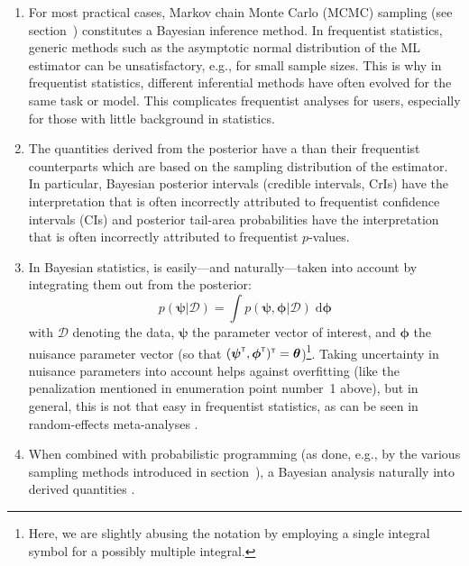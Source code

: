 \begin{enumerate}
  \item For most practical cases, Markov chain Monte Carlo (MCMC) sampling (see
  section~) constitutes a  Bayesian inference
  method. In frequentist statistics, generic methods such as the asymptotic
  normal distribution of the ML estimator can be unsatisfactory, e.g., for
  small sample sizes. This is why in frequentist statistics, different
  inferential methods have often evolved for the same task or model. This
  complicates frequentist analyses for users, especially for those with
  little background in statistics.

  \item The quantities derived from the posterior have a  than their frequentist counterparts which are based on the
  sampling distribution of the estimator. In particular, Bayesian posterior
  intervals (credible intervals, CrIs) have the interpretation that is often
  incorrectly attributed to frequentist confidence intervals (CIs)
  \citep{mcelreath_statistical_2020} and posterior tail-area probabilities
  have the interpretation that is often incorrectly attributed to frequentist
  $p$-values.

  \item In Bayesian statistics,  is
  easily---and naturally---taken into account by integrating them out from
  the posterior:
  \begin{equation}
  p(\boldsymbol{\psi} | \boldsymbol{\mathcal{D}}) =
  \int p(\boldsymbol{\psi}, \boldsymbol{\phi} | \boldsymbol{\mathcal{D}})
  \; \text{d}\boldsymbol{\phi}
    \label{eqn:nuisance}
  \end{equation}
  with $\boldsymbol{\mathcal{D}}$ denoting the data, $\boldsymbol{\psi}$
  the parameter vector of interest, and $\boldsymbol{\phi}$ the nuisance parameter vector (so that
  $(\boldsymbol{\psi}^{\scriptscriptstyle \mathsf{T}}, \boldsymbol{\phi}^{\scriptscriptstyle \mathsf{T}})^{\scriptscriptstyle \mathsf{T}} = \boldsymbol{\theta}$)\footnote{Here, we are
  slightly abusing the notation by employing a single integral symbol for a possibly multiple integral.}.
  Taking uncertainty in nuisance parameters into account helps against overfitting
  (like the penalization mentioned in enumeration point number~1 above), but
  in general, this is not that easy in frequentist statistics, as can be seen in
  random-effects meta-analyses \citep{weber_interval_2021}.

  \item When combined with probabilistic programming (as done, e.g., by the
  various sampling methods introduced in section~), a Bayesian
  analysis naturally  into derived
  quantities \citep{gelman_regression_2020}.


\end{enumerate}
